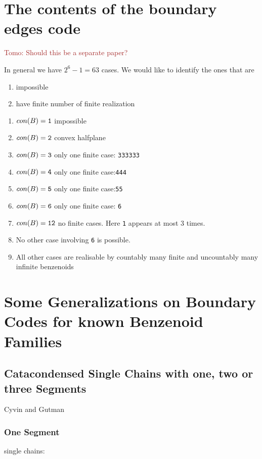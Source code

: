 \documentclass[a4paper,10pt]{article}
\newcommand\Tomo[1]{\textcolor{brown}{Tomo: #1}}
\begin{document}
{%
\section{The contents of the boundary edges code}
\Tomo{Should this be a separate paper?}

In general we have $2^6-1 = 63$ cases. We would like to identify the ones that are
\begin{enumerate}
\item impossible
\item have finite number of finite realization
\end{enumerate}

\begin{enumerate}
\item $con(B) = {\tt 1}$ impossible
\item $con(B) = {\tt 2}$ convex halfplane
\item $con(B) = {\tt 3}$ only one finite case: {\tt 333333}
\item $con(B) = {\tt 4}$ only one finite case:{\tt 444}
\item $con(B) = {\tt 5}$ only one finite case:{\tt 55}
\item $con(B) = {\tt 6}$ only one finite case: {\tt 6}
\item $con(B) = {\tt 12}$ no finite cases. Here {\tt 1} appears at most 3 times.
\item No other case involving {\tt 6} is possible.
\item All other cases are realisable by countably many finite and uncountably 
many infinite benzenoids
\end{enumerate}


\section{Some Generalizations on Boundary Codes for known Benzenoid Families}

\subsection{Catacondensed Single Chains with one, two or three Segments}

Cyvin and Gutman~\cite[p.~62]{cyvin_1988} 

\subsubsection{One Segment}
single chains:

}
\end{document}
